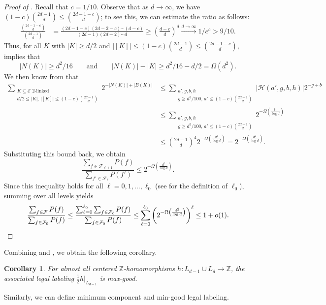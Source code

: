 \documentclass{amsart}
\newtheorem{cor}[thm]{Corollary}
\theoremstyle{definition}
\newcommand{\ZZ}{\mathbb{Z}}
\newcommand{\cE}{\mathcal{E} }
\newcommand{\cF}{\mathcal{F} }
\newcommand{\cH}{\mathcal{H} }
\newcommand{\0}[0]{\emptyset}
\begin{document}
\begin{proof}[Proof of ]
Recall that $c=1/10$. Observe that as $d\to\infty$, we have $(1-c)\binom{2d-1}{d}\leq \binom{2d-1-c}{d}$; to see this, we can estimate the ratio as follows:
\begin{align*}
    \frac{\binom{2d-1-c}{d}}{\binom{2d-1}{d}}&=\frac{(2d-1-c)(2d-2-c)\cdots(d-c)}{(2d-1)(2d-2)\cdots d}\geq \left(\frac{d-c}{d}\right)^d \overset{d\to\infty}{\longrightarrow} 1/e^{c}>9/10.
\end{align*} 
Thus, for all $K$ with $|K|\ge d/2$ and $|[K]|\leq (1-c)\binom{2d-1}{d}\leq\binom{2d-1-c}{d}$,  implies that 
\[
|N(K)|\ge d^2/16
\qquad\text{and}\qquad
|N(K)|-|K|\ge d^2/16-d/2=\Omega(d^2).
\]
We then know from  that
\begin{align*}
  \sum_{\substack{K\subseteq\cE\text{ 2-linked}\\d/2\leq |K|,\,|[K]|\leq (1-c)\binom{2d-1}{d}}}2^{-|N(K)|+|B(K)|}&\le \sum_{\substack{a',g,b,h\\g\geq d^2/100,\, a'\leq (1-c)\binom{2d-1}{d}}}|\cH(a',g,b,h)|2^{-g+b}\\
    &\leq \sum_{\substack{a',g,b,h\\g\geq d^2/100,\, a'\leq (1-c)\binom{2d-1}{d}}} 2^{-\Omega\left(\frac{t_1}{\log d}\right)} \\
    &\le \binom{2d-1}{d}^4 2^{-\Omega\left(\frac{d^2}{\log d}\right)}  =2^{-\Omega\left(\frac{d^2}{\log d}\right)}.
\end{align*}
Substituting this bound back, we obtain
\[
\frac{ \sum_{f\in\cF_{\ell+1}}P(f)}{ \sum_{f'\in\cF_{\ell}}P(f')}\leq 2^{-\Omega\left(\frac{d^2}{\log d}\right)}.
\]
Since this inequality holds for all $\ell=0,1,\dots,\ell_0$ (see  for the definition of $\ell_0$), summing over all levels yields
\[
\frac{\sum_{f\in\cF}P(f)}{\sum_{f\in\cF_{0}}P(f)}\leq \frac{\sum_{\ell=0}^{\ell_0}\sum_{f\in\cF_\ell}P(f)}{\sum_{f\in\cF_{0}}P(f)}\leq \sum_{\ell=0}^{\ell_0} \left(2^{-\Omega\left(\frac{d^2}{\log d}\right)}\right)^{\ell}\leq 1+o(1).\qedhere
\]
\end{proof}

Combining  and , we obtain the following corollary. 

\begin{cor}\label{cor:max-good}
For almost all centered $\ZZ$-homomorphisms $h:L_{d-1}\cup L_{d}\to\ZZ$, the associated legal labeling $\frac{1}{2}h|_{L_{d-1}}$ is max-good.
\end{cor}

Similarly, we can define minimum component and min-good legal labeling.
\end{document}
